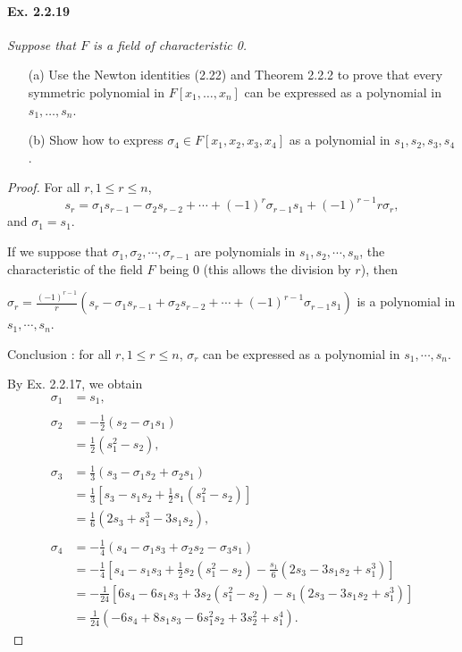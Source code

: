 \documentclass[11pt,a4paper]{article}
\begin{document}
\paragraph{Ex. 2.2.19}

{\it Suppose that $F$ is a field of characteristic 0.
\begin{enumerate}
\item[(a)] Use the Newton identities (2.22) and Theorem 2.2.2 to prove that every symmetric polynomial in $F[x_1,\ldots,x_n]$ can be expressed as a polynomial in $s_1,\ldots,s_n$.
\item[(b)] Show how to express $\sigma_4 \in F[x_1,x_2,x_3,x_4]$ as a polynomial in $s_1,s_2,s_3,s_4$.
\end{enumerate}
}

\begin{proof}
For all $r, 1\leq r \leq n$,
 $$s_r = \sigma_1 s_{r-1}-\sigma_2 s_{r-2}+\cdots+(-1)^r\sigma_{r-1}s_1 + (-1)^{r-1} r \sigma_r,$$
 and $\sigma_1 = s_1$.
 
 If we suppose that $\sigma_1,\sigma_2,\cdots,\sigma_{r-1}$ are polynomials in $s_1,s_2,\cdots,s_n$, the characteristic of the field $F$ being 0 (this allows the division by $r$), then
 
 $\sigma_r =\frac{ (-1)^{r-1}}{r}(s_r - \sigma_1 s_{r-1}+\sigma_2 s_{r-2}+\cdots+(-1)^{r-1} \sigma_{r-1}s_1)$
is a polynomial in $s_1,\cdots,s_n$.
 
 Conclusion : for all $r,1\leq r \leq n$, $\sigma_r$ can be expressed as a polynomial in $s_1,\cdots,s_n$.
 
By Ex. 2.2.17, we obtain
 \begin{align*}
\sigma_1 &= s_1,\\
\\
 \sigma_2 &= -\frac{1}{2}(s_2 - \sigma_1 s_1 )\\
 &=\frac{1}{2}(s_1^2-s_2),\\
 \\
 \sigma_3 &= \frac{1}{3}(s_3-\sigma_1s_2+\sigma_2s_1)\\
 &=\frac{1}{3}\left[s_3-s_1s_2+\frac{1}{2}s_1(s_1^2-s_2) \right]\\
 &=\frac{1}{6}(2s_3+s_1^3-3s_1s_2),\\
 \\
 \sigma_4 &=-\frac{1}{4}(s_4-\sigma_1s_3+\sigma_2s_2-\sigma_3s_1)\\
 &=-\frac{1}{4} \left[  s_4 - s_1s_3 +\frac{1}{2} s_2(s_1^2-s_2) -\frac{s_1}{6}(2s_3-3s_1s_2+s_1^3) \right]\\
 &=-\frac{1}{24}\left[   6s_4 - 6 s_1s_3 +3 s_2(s_1^2-s_2)-s_1(2s_3-3s_1s_2+s_1^3)\right]\\
 &=\frac{1}{24}(-6s_4+8s_1s_3-6s_1^2s_2+3s_2^2+s_1^4).
 \end{align*}
\end{proof}
\end{document}
